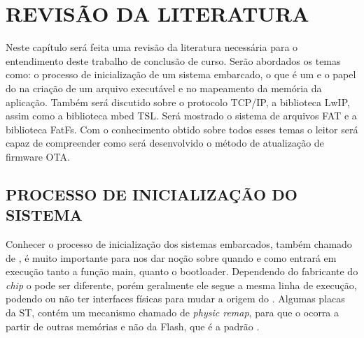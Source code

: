 
\chapter{REVISÃO DA LITERATURA}
\label{chap:fundamentacaoTeorica}
Neste capítulo será feita uma revisão da literatura necessária para o entendimento deste trabalho de conclusão de curso. 
Serão abordados os temas como: o processo de inicialização de um sistema embarcado, o que é um \bootloader  e o papel do \linker na criação de um arquivo executável e no mapeamento da memória da aplicação.
Também será discutido sobre o protocolo TCP/IP, a biblioteca LwIP, assim como a biblioteca mbed TSL.
Será mostrado o sistema de arquivos FAT e a biblioteca FatFs.
Com o conhecimento obtido sobre todos esses temas o leitor será capaz de compreender como será desenvolvido o método de atualização de firmware OTA.


\section{PROCESSO DE INICIALIZAÇÃO DO SISTEMA}

Conhecer o processo de inicialização dos sistemas embarcados, também chamado de \boot, é muito importante para nos dar noção sobre quando e como entrará em execução tanto a função main, quanto o bootloader.
Dependendo do fabricante do \textit{chip} o \boot pode ser diferente, porém geralmente ele segue a mesma linha de execução, podendo ou não ter interfaces físicas para mudar a origem do \boot. Algumas placas da ST\cite{ST2019}, contém um mecanismo chamado de \textit{physic remap}, para que o \boot ocorra a partir de outras memórias e não da Flash, que é a padrão \cite{Noviello2018}.

